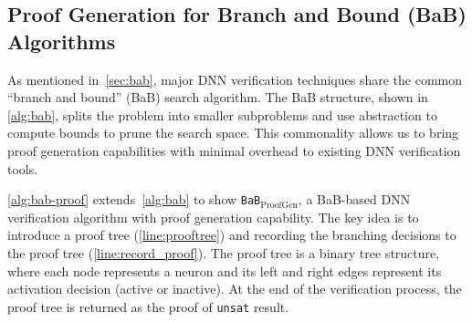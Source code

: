 \documentclass[oneside,11pt,dvipsnames]{book}
\numberwithin{equation}{section}
\theoremstyle{definition}
\theoremstyle{remark}
\newcommand{\proofgen}{\texttt{BaB$_{\text{ProofGen}}$}}
\newcommand{\neuralsat}{\texttt{NeuralSAT}}
\begin{document}





\subsection{Proof Generation for Branch and Bound (BaB) Algorithms}\label{sec:proogen}

As mentioned in~\autoref{sec:bab}, major DNN verification techniques share the common ``branch and bound'' (BaB) search algorithm. The BaB structure, shown in~ \autoref{alg:bab}, splits the problem into smaller subproblems and use abstraction to compute bounds to prune the search space. This commonality allows us to bring proof generation capabilities with minimal overhead to existing DNN verification tools.

\autoref{alg:bab-proof} extends~\autoref{alg:bab} to show \proofgen, a BaB-based DNN verification algorithm with proof generation capability. The key idea is to introduce a proof tree (\autoref{line:prooftree}) and recording the branching decisions to the proof tree (\autoref{line:record_proof}).
The proof tree is a binary tree structure, where each node represents a neuron and its left and right edges represent its activation decision (active or inactive).
At the end of the verification process, the proof tree is returned as the proof of \texttt{unsat} result. 
\end{document}
